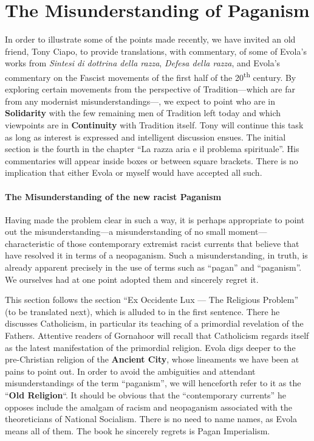 \section{The Misunderstanding of Paganism}

\begin{quotex}
In order to illustrate some of the points made recently, we have invited an old friend, Tony Ciapo, to provide translations, with commentary, of some of Evola's works from \textit{Sintesi di dottrina della razza}, \textit{Defesa della razza}, and Evola's commentary on the Fascist movements of the first half of the 20\textsuperscript{th} century. By exploring certain movements from the perspective of Tradition---which are far from any modernist misunderstandings---, we expect to point who are in \textbf{Solidarity} with the few remaining men of Tradition left today and which viewpoints are in \textbf{Continuity} with Tradition itself. Tony will continue this task as long as interest is expressed and intelligent discussion ensues. The initial section is the fourth in the chapter ``La razza aria e il problema spirituale''. His commentaries will appear inside boxes or between square brackets. There is no implication that either Evola or myself would have accepted all such.
\end{quotex}

\paragraph{The Misunderstanding of the new racist Paganism}


Having made the problem clear in such a way, it is perhaps appropriate to point out the misunderstanding---a misunderstanding of no small moment--- characteristic of those contemporary extremist racist currents that believe that have resolved it in terms of a neopaganism. Such a misunderstanding, in truth, is already apparent precisely in the use of terms such as ``pagan'' and ``paganism''. We ourselves had at one point adopted them and sincerely regret it.

\begin{quotex}
This section follows the section ``Ex Occidente Lux --- The Religious Problem'' (to be translated next), which is alluded to in the first sentence. There he discusses Catholicism, in particular its teaching of a primordial revelation of the Fathers. Attentive readers of Gornahoor will recall that Catholicism regards itself as the latest manifestation of the primordial religion. Evola digs deeper to the pre-Christian religion of the \textbf{Ancient City}, whose lineaments we have been at pains to point out. In order to avoid the ambiguities and attendant misunderstandings of the term ``paganism'', we will henceforth refer to it as the ``\textbf{Old Religion}``. It should be obvious that the ``contemporary currents'' he opposes include the amalgam of racism and neopaganism associated with the theoreticians of National Socialism. There is no need to name names, as Evola means all of them. The book he sincerely regrets is Pagan Imperialism.
\end{quotex}

